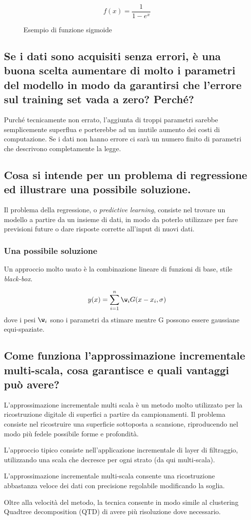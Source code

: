 \documentclass[\main/main.tex]{subfiles}
\begin{document}
\begin{figure}
  \[
    f(x) = \frac{1}{1-e^x}
  \]
  \caption{Esempio di funzione sigmoide}
\end{figure}

\subsection{Se i dati sono acquisiti senza errori, è una buona scelta aumentare di molto i parametri del modello in modo da garantirsi che l'errore sul training set vada a zero? Perché?}
Purché tecnicamente non errato, l'aggiunta di troppi parametri sarebbe semplicemente superflua e porterebbe ad un inutile aumento dei costi di computazione. Se i dati non hanno errore ci sarà un numero finito di parametri che descrivono completamente la legge.

\subsection{Cosa si intende per un problema di regressione ed illustrare una possibile soluzione.}
Il problema della regressione, o \textit{predictive learning}, consiste nel trovare un modello a partire da un insieme di dati, in modo da poterlo utilizzare per fare previsioni future o dare risposte corrette all'input di nuovi dati.
\subsubsection*{Una possibile soluzione}
Un approccio molto usato è la combinazione lineare di funzioni di base, stile \textit{black-box}.

\[
  y(x) = \sum_{i=1}^n \w_i G(x-x_i, \sigma)
\]
dove i pesi $\w_i$ sono i parametri da stimare mentre G possono essere gaussiane equi-spaziate.

\subsection{Come funziona l'approssimazione incrementale multi-scala, cosa garantisce e quali vantaggi può avere?}
L'approssimazione incrementale multi scala è un metodo molto utilizzato per la ricostruzione digitale di superfici a partire da campionamenti. Il problema consiste nel ricostruire una superficie sottoposta a scansione, riproducendo nel modo più fedele possibile forme e profondità.

L'approccio tipico consiste nell'applicazione incrementale di layer di filtraggio, utilizzando una scala che decresce per ogni strato (da qui multi-scala).

L'approssimazione incrementale multi-scala consente una ricostruzione abbastanza veloce dei dati con precisione regolabile modificando la soglia.

Oltre alla velocità del metodo, la tecnica consente in modo simile al clustering Quadtree decomposition (QTD) di avere più risoluzione dove necessario.
\end{document}
